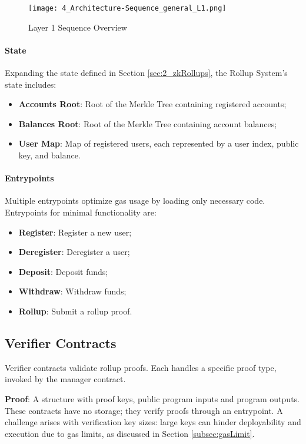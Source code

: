 \begin{figure}[ht]
  \centering
  \texttt{[image: 4\_Architecture-Sequence\_general\_L1.png]}
  \caption{Layer 1 Sequence Overview}
  \label{fig:layer1sequencediagram}
\end{figure}

\paragraph{State}
Expanding the state defined in Section \ref{sec:2_zkRollups}, the Rollup System's state includes:
\begin{itemize}
  \item \textbf{Accounts Root}: Root of the Merkle Tree containing registered accounts;
  \item \textbf{Balances Root}: Root of the Merkle Tree containing account balances;
  \item \textbf{User Map}: Map of registered users, each represented by a user index, public key, and balance.
\end{itemize}

\paragraph{Entrypoints}
Multiple entrypoints optimize gas usage by loading only necessary code. Entrypoints for minimal functionality are:
\begin{itemize}
  \item \textbf{Register}: Register a new user;
  \item \textbf{Deregister}: Deregister a user;
  \item \textbf{Deposit}: Deposit funds;
  \item \textbf{Withdraw}: Withdraw funds;
  \item \textbf{Rollup}: Submit a rollup proof.
\end{itemize}

\subsection{Verifier Contracts\label{sec:designverifiercontracts}}
Verifier contracts validate rollup proofs. Each handles a specific proof type, invoked by the manager contract.

\textbf{Proof}: A structure with proof keys, public program inputs and program outputs.
\newline These contracts have no storage; they verify proofs through an entrypoint. A challenge arises with verification key sizes: large keys can hinder deployability and execution due to gas limits, as discussed in Section \ref{subsec:gasLimit}. 

